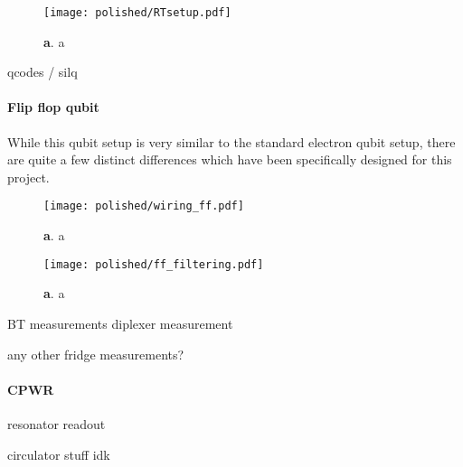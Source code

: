 
\begin{figure}
	\centering
	\texttt{[image: polished/RTsetup.pdf]}
	\caption[queeni filtering]{\textbf{a}. a }
	\label{fig:queenie_rtsetup}
\end{figure}

qcodes / silq

\paragraph{Flip flop qubit}

While this qubit setup is very similar to the standard electron qubit setup, there are quite a few distinct differences which have been specifically designed for this project. 

\begin{figure}
	\centering
	\texttt{[image: polished/wiring\_ff.pdf]}
	\caption[ff filtering]{\textbf{a}. a }
	\label{fig:sem_ff_v1}
\end{figure}

\begin{figure}
	\centering
	\texttt{[image: polished/ff\_filtering.pdf]}
	\caption[ff filtering]{\textbf{a}. a }
	\label{fig:sem_ff_v1}
\end{figure}

BT measurements
diplexer measurement

any other fridge measurements?

\paragraph{CPWR}
resonator readout

circulator stuff idk



